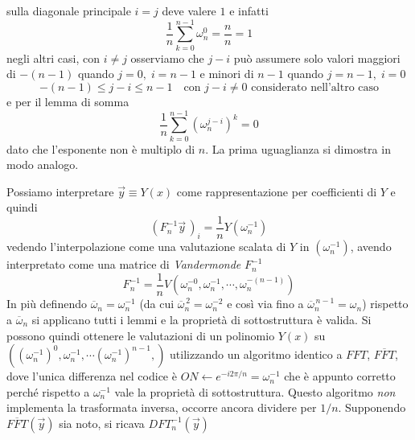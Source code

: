 sulla diagonale principale $i=j$ deve valere $1$ e infatti
\begin{equation*}
    \frac{1}{n} \sum_{k=0}^{n-1} \omega_n^{0} =
    \frac{n}{n} = 1
\end{equation*}
negli altri casi, con $i \neq j$ osserviamo che $j-i$ può assumere solo valori maggiori di $-(n-1)$ quando $j=0, \; i=n-1$ e minori di $n-1$ quando $j=n-1, \; i=0$
\begin{equation*}
    -(n-1) \leq j-i \leq n-1
    \quad \text{con }j-i \neq 0 
    \text{ considerato nell'altro caso}
\end{equation*}
e per il lemma di somma
\begin{equation*}
    \frac{1}{n} \sum_{k=0}^{n-1} \left( \omega_n^{j-i} \right)^k = 0
\end{equation*}
dato che l'esponente non è multiplo di $n$. La prima uguaglianza si dimostra in modo analogo.

Possiamo interpretare $\vec{y} \equiv Y(x)$ come rappresentazione per coefficienti di $Y$ e quindi
\begin{equation*}
\left( F_n^{-1} \vec{y} \, \right)_i = \frac{1}{n} Y \left( \omega_n^{-1} \right)
\end{equation*}
vedendo l'interpolazione come una valutazione scalata di $Y$ in $\left( \omega_n^{-1} \right)$, avendo interpretato come una matrice di \textit{Vandermonde} $F_n^{-1}$
\begin{equation*}
    F_n^{-1} = \frac{1}{n} V \left( \omega_n^{-0}, \omega_n^{-1}, \cdots, \omega_n^{-\left( n-1 \right)} \right)
\end{equation*}
In più definendo $\overline{\omega}_n = \omega_n^{-1}$
(da cui $\overline{\omega}_n^{\,2} = \omega_n^{-2}$ e così via fino a $\overline{\omega}_n^{\,n-1} = \omega_n$)
rispetto a $\overline{\omega}_n$ si applicano tutti i lemmi e la proprietà di sottostruttura è valida. Si possono quindi ottenere le valutazioni di un polinomio $Y(x)$ su $\left( \left( \omega_n^{-1} \right)^{0}, \omega_n^{-1}, \cdots \left( \omega_n^{-1} \right)^{n-1}, \right)$ utilizzando un algoritmo identico a $FFT$, $\overline{FFT}$, dove l'unica differenza nel codice è $ON \gets e^{-i2\pi/n} = \omega_n^{-1}$ che è appunto corretto perché rispetto a $\omega_n^{-1}$ vale la proprietà di sottostruttura. Questo algoritmo \emph{non} implementa la trasformata inversa, occorre ancora dividere per $1/n$. Supponendo $\overline{FFT} \left( \vec{y} \right)$ sia noto, si ricava $DFT_n^{-1} \left( \vec{y} \right)$

